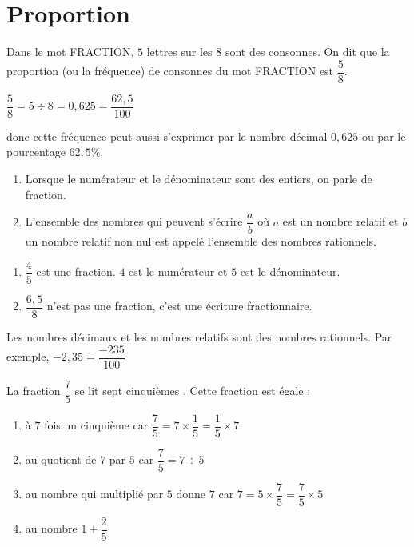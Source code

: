 \documentclass[a4paper,10pt]{report}
\begin{document}
\vspace{-3mm}
\section{Proportion}

\begin{ex}
Dans le mot FRACTION, $5$ lettres sur les $8$ sont des consonnes.
On dit que la proportion (ou la fréquence) de consonnes du mot FRACTION est $\dfrac{5}{8}$.

\medskip
\noindent $\dfrac{5}{8} = 5 \div 8 = 0,625 = \dfrac{62,5}{100}$ 

\noindent donc cette fréquence peut aussi s'exprimer par le nombre décimal $0,625$ ou par le pourcentage $62,5 \%$.
\end{ex}

\begin{defn}
\begin{enumerate}
\item[•] Lorsque le numérateur et le dénominateur sont des entiers, on parle de fraction.
\item[•] L'ensemble des nombres qui peuvent s'écrire $\dfrac{a}{b}$ où $a$ est un nombre relatif et $b$ un nombre relatif non nul est appelé l'ensemble des nombres rationnels.
\end{enumerate}
\end{defn}

\begin{ex}
\begin{enumerate}
\item[•] $\dfrac{4}{5}$ est une fraction. $4$ est le numérateur et $5$ est le dénominateur.
\item[•] $\dfrac{6,5}{8}$ n'est pas une fraction, c'est une écriture fractionnaire.
\end{enumerate}
\end{ex}

\begin{rem}
Les nombres décimaux et les nombres relatifs sont des nombres rationnels. Par exemple, $-2,35 = \dfrac{-235}{100}$
\end{rem}

\begin{memento}
La fraction $\dfrac{7}{5}$ se lit \og sept cinquièmes \fg{}. Cette fraction est égale :
\begin{enumerate}
\item[•] à $7$ fois un cinquième car $\dfrac{7}{5} = 7 \times \dfrac{1}{5} = \dfrac{1}{5} \times 7$
\item[•] au quotient de $7$ par $5$ car $\dfrac{7}{5} = 7 \div 5$
\item[•] au nombre qui multiplié par $5$ donne $7$ car $7 = 5 \times \dfrac{7}{5} = \dfrac{7}{5} \times 5$
\item[•] au nombre $1 + \dfrac{2}{5}$
\end{enumerate}
\end{memento}
\end{document}
